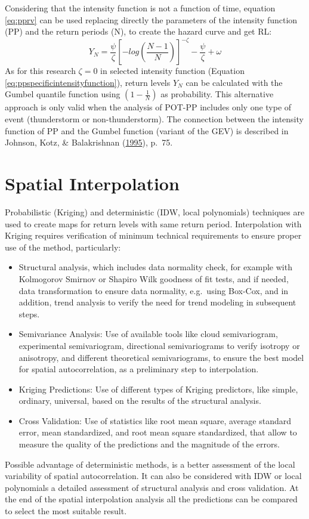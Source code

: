 \documentclass[12pt,oneside]{reedthesis}
\begin{document}
Considering that the intensity function is not a function of time, equation \eqref{eq:pprv} can be used replacing directly the parameters of the intensity function (PP) and the return periods (N), to create the hazard curve and get RL:
\begin{equation}
Y_N=\frac{\psi}{\zeta}\left[-log\left(\frac{N-1}{N}\right)\right]^{-\zeta}-\frac{\psi}{\zeta}+\omega
  \label{eq:pprv}
\end{equation}
As for this research \(\zeta = 0\) in selected intensity function (Equation \eqref{eq:ppspecificintensityfunction}), return levels \(Y_N\) can be calculated with the Gumbel quantile function using \((1-\frac{1}{N})\) as probability. This alternative approach is only valid when the analysis of POT-PP includes only one type of event (thunderstorm or non-thunderstorm). The connection between the intensity function of PP and the Gumbel function (variant of the GEV) is described in Johnson, Kotz, \& Balakrishnan (\protect\hyperlink{ref-Johnson1995}{1995}), p.~75.

\hypertarget{si}{%
\section{Spatial Interpolation}\label{si}}

Probabilistic (Kriging) and deterministic (IDW, local polynomials) techniques are used to create maps for return levels with same return period. Interpolation with Kriging requires verification of minimum technical requirements to ensure proper use of the method, particularly:
\begin{itemize}
\item
  Structural analysis, which includes data normality check, for example with Kolmogorov Smirnov or Shapiro Wilk goodness of fit tests, and if needed, data transformation to ensure data normality, e.g.~using Box-Cox, and in addition, trend analysis to verify the need for trend modeling in subsequent steps.
\item
  Semivariance Analysis: Use of available tools like cloud semivariogram, experimental semivariogram, directional semivariograms to verify isotropy or anisotropy, and different theoretical semivariograms, to ensure the best model for spatial autocorrelation, as a preliminary step to interpolation.
\item
  Kriging Predictions: Use of different types of Kriging predictors, like simple, ordinary, universal, based on the results of the structural analysis.
\item
  Cross Validation: Use of statistics like root mean square, average standard error, mean standardized, and root mean square standardized, that allow to measure the quality of the predictions and the magnitude of the errors.
\end{itemize}
Possible advantage of deterministic methods, is a better assessment of the local variability of spatial autocorrelation. It can also be considered with IDW or local polynomials a detailed assessment of structural analysis and cross validation. At the end of the spatial interpolation analysis all the predictions can be compared to select the most suitable result.
\end{document}
